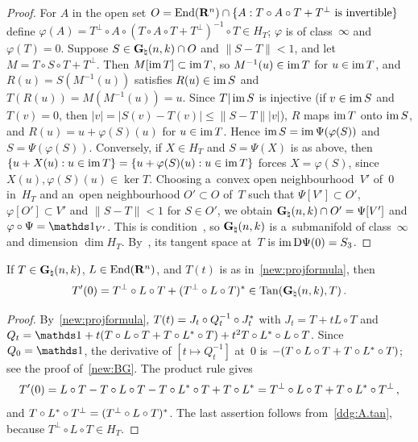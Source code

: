 \documentclass[a4paper,twoside,leqno]{article}
\newcommand{\Gk}{\pgrass{\adim}{\vdim}}        %
\newcommand{\MS}{\textbf{[MS path]}}            %
\begin{document}
\begin{proof}
    For $A$ in the open set $O = \mathrm{End}({\mathbf{R}^{n}}) \cap \{ A : T \circ A \circ T + T^\perp \text{ is
    invertible} \}$ define $\varphi(A) = T^\perp \circ A \circ (T \circ A \circ T + T^\perp)^{-1}
    \circ T \in H_T$; $\varphi$ is of class~$\infty$ and $\varphi(T) = 0$. Suppose $S \in \Gk \cap
    O$ and $\|S - T\| < 1$, and let $M = T \circ S \circ T + T^\perp$. Then $M[\operatorname{im} T] \subset \operatorname{im}
    T$, so $M^{-1}(u) \in \operatorname{im} T$ for $u \in \operatorname{im} T$, and $R(u) = S(M^{-1}(u))$ satisfies $R(u) \in \operatorname{im}
    S$ and $T(R(u)) = M(M^{-1}(u)) = u$. Since $T | \operatorname{im} S$ is injective (if $v \in \operatorname{im} S$ and
    $T(v) = 0$, then $|v| = |S(v) - T(v)| \le \|S - T\| |v|$), $R$ maps $\operatorname{im} T$ onto $\operatorname{im} S$, and
    $R(u) = u + \varphi(S)(u)$ for $u \in \operatorname{im} T$. Hence $\operatorname{im} S = \operatorname{im} \Psi(\varphi(S))$ and $S =
    \Psi(\varphi(S))$. Conversely, if $X \in H_T$ and $S = \Psi(X)$ is as above, then
    $\{ u + X(u) : u \in \operatorname{im} T \} = \{ u + \varphi(S)(u) : u \in \operatorname{im} T \}$ forces $X = \varphi(S)$,
    since $X(u), \varphi(S)(u) \in \ker T$. Choosing a~convex open neighbourhood~$V'$ of~$0$
    in~$H_T$ and an~open neighbourhood $O' \subset O$ of~$T$ such that $\Psi[V'] \subset O'$,
    $\varphi[O'] \subset V'$ and $\|S - T\| < 1$ for $S \in O'$, we obtain $\Gk \cap O' = \Psi[V']$
    and $\varphi \circ \Psi = \id{V'}$. This is condition~\cite[3.1.19(4)]{Federer1969}, so $\Gk$ is
    a~submanifold of class~$\infty$ and dimension $\dim H_T$. By~\cite[3.1.21]{Federer1969}, its
    tangent space at~$T$ is $\operatorname{im} \mathrm{D} \Psi(0) = S_3$.
\end{proof}

\begin{lemma}[{\cite[Lemma~A.1]{DePhilippis2018}; \MS}]
    \label{ddg:A.lemma1}
    If $T \in \Gk$, $L \in \mathrm{End}({\mathbf{R}^{n}})$, and $T(t)$ is as in~\ref{new:projformula}, then
    \begin{displaymath}
        T'(0) = T^\perp \circ L \circ T + \transpose{(T^\perp \circ L \circ T)} \in \Tan(\Gk,T) \,.
    \end{displaymath}
\end{lemma}

\begin{proof}
    By~\ref{new:projformula}, $T(t) = J_t \circ Q_t^{-1} \circ J_t^{*}$ with $J_t = T + t L
    \circ T$ and $Q_t = \id{} + t(T \circ L \circ T + T \circ \transpose{L} \circ T) + t^2 T \circ
    \transpose{L} \circ L \circ T$. Since $Q_0 = \id{}$, the derivative of $[ t \mapsto Q_t^{-1} ]$
    at~$0$ is $-(T \circ L \circ T + T \circ L^{*} \circ T)$; see the proof
    of~\ref{new:BG}. The product rule gives
    \begin{displaymath}
        T'(0) = L \circ T - T \circ L \circ T - T \circ L^{*} \circ T + T \circ
        L^{*} = T^\perp \circ L \circ T + T \circ L^{*} \circ T^\perp \,,
    \end{displaymath}
    and $T \circ L^{*} \circ T^\perp = (T^\perp \circ L \circ T)^{*}$. The last
    assertion follows from~\ref{ddg:A.tan}, because $T^\perp \circ L \circ T \in H_T$.
\end{proof}
\end{document}
